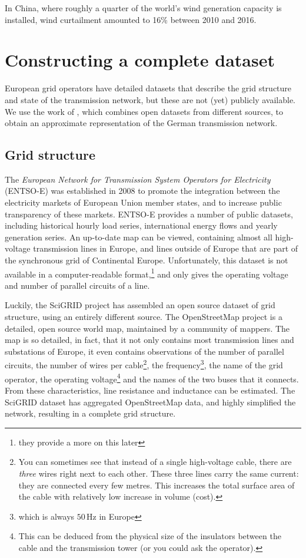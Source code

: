 \documentclass[main.tex]{subfiles}
\begin{document}
In China, where roughly a quarter of the world's wind generation capacity is installed, wind curtailment amounted to 16\% between 2010 and 2016. \citep{Qi2018}

\section{Constructing a complete dataset}\label{sec:constructingdataset}
European grid operators have detailed datasets that describe the grid structure and state of the transmission network, but these are not (yet) publicly available. We use the work of \cite{PyPSA}, which combines open datasets from different sources, to obtain an approximate representation of the German transmission network. 

\subsection{Grid structure}
The \emph{European Network for Transmission System Operators for Electricity} (ENTSO-E) was established in 2008 to promote the integration between the electricity markets of European Union member states, and to increase public transparency of these markets.
ENTSO-E provides a number of public datasets, including historical hourly load series, international energy flows and yearly generation series.
An up-to-date map can be viewed, containing almost all high-voltage transmission lines in Europe, and lines outside of Europe that are part of the synchronous grid of Continental Europe. Unfortunately, this dataset is not available in a computer-readable format,\footnote{they provide a more on this later} and only gives the operating voltage and number of parallel circuits of a line.

Luckily, the SciGRID project has assembled an open source dataset of grid structure, using an entirely different source. The OpenStreetMap project is a detailed, open source world map, maintained by a community of mappers. The map is so detailed, in fact, that it not only contains most transmission lines and substations of Europe, it even contains observations of the number of parallel circuits, the number of wires per cable\footnote{You can sometimes see that instead of a single high-voltage cable, there are \emph{three} wires right next to each other. These three lines carry the same current: they are connected every few metres. This increases the total surface area of the cable with relatively low increase in volume (\ie cost).}, the frequency\footnote{which is always $50\,\si{\hertz}$ in Europe}, the name of the grid operator, the operating voltage\footnote{This can be deduced from the physical size of the insulators between the cable and the transmission tower (or you could ask the operator).} and the names of the two buses that it connects. From these characteristics, line resistance and inductance can be estimated.
The SciGRID dataset has aggregated OpenStreetMap data, and highly simplified the network, resulting in a complete grid structure.
\end{document}
